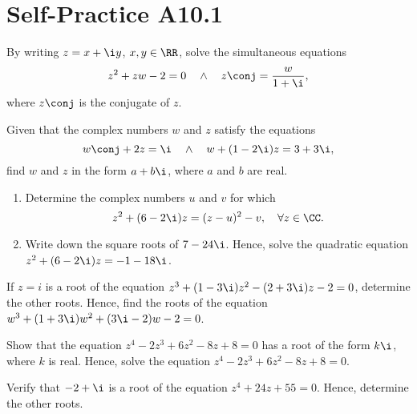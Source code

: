 \section{Self-Practice A10.1}

\begin{problem}
    By writing $z = x + \i y$, $x, y \in \RR$, solve the simultaneous equations \[z^2 + zw - 2 = 0 \quad \land \quad z\conj = \frac{w}{1 + \i},\] where $z\conj$ is the conjugate of $z$.
\end{problem}

\begin{problem}
    Given that the complex numbers $w$ and $z$ satisfy the equations \[w\conj + 2z = \i \quad \land \quad w + (1 - 2\i)z = 3 + 3\i,\] find $w$ and $z$ in the form $a + b \i$, where $a$ and $b$ are real.
\end{problem}

\begin{problem}
    \begin{enumerate}
        \item Determine the complex numbers $u$ and $v$ for which \[z^2 + (6-2\i)z = (z-u)^2 - v, \quad \forall z \in \CC.\]
        \item Write down the square roots of $7 - 24\i$. Hence, solve the quadratic equation $z^2 + (6-2\i)z = -1 - 18\i$.
    \end{enumerate}
\end{problem}

\begin{problem}
    If $z = i$ is a root of the equation $z^3 + (1-3\i)z^2 - (2+3\i)z - 2 = 0$, determine the other roots. Hence, find the roots of the equation $w^3 + (1 + 3\i)w^2 + (3\i-2)w - 2 = 0$.
\end{problem}

\begin{problem}
    Show that the equation $z^4 - 2z^3 + 6z^2 - 8z + 8 = 0$ has a root of the form $k\i$, where $k$ is real. Hence, solve the equation $z^4 - 2z^3 + 6z^2 - 8z + 8 = 0$.
\end{problem}

\begin{problem}
    Verify that $-2 + \i$ is a root of the equation $z^4 + 24z + 55 = 0$. Hence, determine the other roots.
\end{problem}